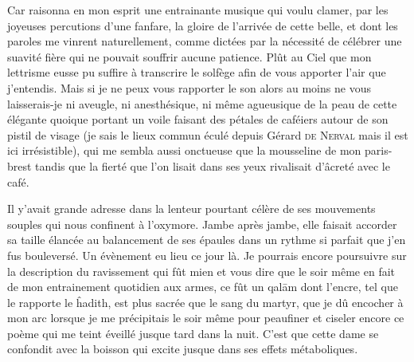\begin{prose}
Car raisonna en mon esprit une entrainante musique qui voulu clamer, par les joyeuses percutions d’une fanfare, la gloire de l’arrivée de cette belle, et dont les paroles me vinrent naturellement, comme dictées par la nécessité de célébrer une suavité fière qui ne pouvait souffrir aucune patience. Plût au Ciel que mon lettrisme eusse pu suffire à transcrire le solfège afin de vous apporter l’air que j’entendis. Mais si je ne peux vous rapporter le son alors au moins ne vous laisserais-je ni aveugle, ni anesthésique, ni même agueusique  de la peau de cette élégante quoique portant un voile faisant des pétales de caféiers autour de son pistil de visage (je sais le lieux commun éculé depuis Gérard \textsc{de Nerval} mais il est ici irrésistible), qui me sembla aussi onctueuse que la mousseline de mon paris-brest tandis que la fierté que l’on lisait dans ses yeux rivalisait d’âcreté avec le café.

Il y’avait grande adresse dans la lenteur pourtant célère de ses mouvements souples qui nous confinent à l’oxymore. Jambe après jambe, elle faisait accorder sa taille élancée au balancement de  ses épaules dans un rythme si parfait que j’en fus bouleversé. Un évènement eu lieu ce jour là. Je pourrais encore poursuivre sur la description du ravissement qui fût mien et vous dire que le soir même en fait de mon entrainement quotidien aux armes, ce fût un qalām dont l’encre, tel que le rapporte le ĥadith, est plus sacrée que le sang du martyr, que je dû encocher à mon arc lorsque je  me précipitais le soir même pour peaufiner et ciseler encore ce poème qui me teint éveillé jusque tard dans la nuit. C’est que cette dame se confondit avec la boisson qui excite jusque dans ses effets métaboliques.
\end{prose}

